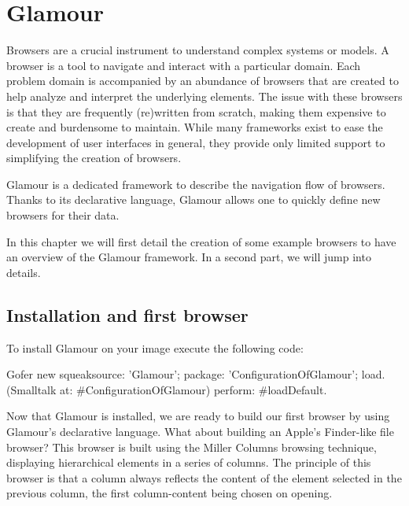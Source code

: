 \documentclass[a4paper,10pt,twoside]{book}
\begin{document}
\fi
\sloppy
\chapter{Glamour}

Browsers are a crucial instrument to understand complex systems or
models. A browser is a tool to navigate and interact with a particular domain.
Each problem domain is accompanied by an abundance of browsers
that are created to help analyze and interpret the underlying
elements. The issue with these browsers is that they are frequently
(re)written from scratch, making them expensive to create and burdensome
to maintain. While many frameworks exist to ease the development of
user interfaces in general, they provide only limited support to
simplifying the creation of browsers.

Glamour is a dedicated framework to describe the navigation flow
of browsers. Thanks to its declarative language, Glamour allows one to
quickly define new browsers for their data.

In this chapter we will first detail the creation of some example
browsers to have an overview of the Glamour framework. In a second
part, we will jump into details.

\section{Installation and first browser}
\label{sec:inst-first-brows}

To install Glamour on your \pharo{} image execute the following code:

  
\begin{code}{}
Gofer new
  squeaksource: 'Glamour'; 
  package: 'ConfigurationOfGlamour';
  load.
(Smalltalk at: #ConfigurationOfGlamour) perform: #loadDefault.
\end{code}

Now that Glamour is installed, we are ready to build our first browser by using Glamour's declarative language. 
What about building an Apple's Finder-like file browser? This browser is built
using the Miller Columns browsing technique, displaying hierarchical
elements in a series of columns. The principle of this browser is
that a column always reflects the content of the element selected in
the previous column, the first column-content being chosen on opening.
\end{document}
